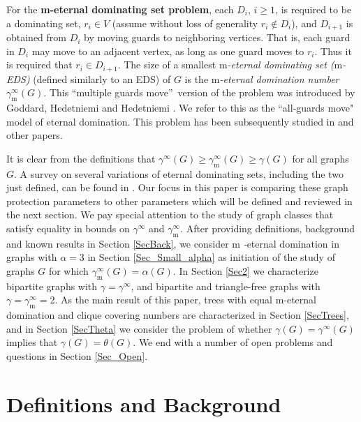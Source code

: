 \documentclass[12pt]{article}%
\begin{document}
For the \textbf{m-eternal dominating set problem}, each $D_{i}$, $i\geq1$, is
required to be a dominating set, $r_{i}\in V$ (assume without loss of
generality $r_{i}\notin D_{i}$), and $D_{i+1}$ is obtained from $D_{i}$ by
moving guards to neighboring vertices. That is, each guard in $D_{i}$ may move
to an adjacent vertex, as long as one guard moves to $r_{i}$. Thus it is
required that $r_{i}\in D_{i+1}$. The size of a smallest $\mathrm{m}%
$\emph{-eternal dominating set (}$\mathrm{m}$\emph{-EDS)} (defined similarly
to an EDS) of $G$ is the $\mathrm{m}$\emph{-eternal domination number}
$\gamma_{\mathrm{m}}^{\infty}(G)$. This \textquotedblleft multiple guards
move\textquotedblright\ version of the problem was introduced by Goddard,
Hedetniemi and Hedetniemi \cite{GHH}. We refer to this as the
\textquotedblleft all-guards move" model of eternal domination. This problem
has been subsequently studied in \cite{GK2, KM2} and other papers.

It is clear from the definitions that $\gamma^{\infty}(G)\geq\gamma
_{\mathrm{m}}^{\infty}(G)\geq\gamma(G)$ for all graphs $G$. A survey on
several variations of eternal dominating sets, including the two just defined,
can be found in \cite{KMSurvey}. Our focus in this paper is comparing these
graph protection parameters to other parameters which will be defined and
reviewed in the next section. We pay special attention to the study of graph
classes that satisfy equality in bounds on $\gamma^{\infty}$ and
$\gamma_{\mathrm{m}}^{\infty}$. After providing definitions, background and
known results in Section \ref{SecBack}, we consider $\mathrm{m}$%
\emph{-}eternal domination in graphs with $\alpha=3$ in Section
\ref{Sec_Small_alpha} as initiation of the study of graphs $G$ for which
$\gamma_{\mathrm{m}}^{\infty}(G)=\alpha(G)$. In Section \ref{Sec2} we
characterize bipartite graphs with $\gamma=\gamma^{\infty}$, and bipartite and
triangle-free graphs with $\gamma=\gamma_{\mathrm{m}}^{\infty}=2$. As the main
result of this paper, trees with equal $\mathrm{m}$-eternal domination and
clique covering numbers are characterized in Section \ref{SecTrees}, and in
Section \ref{SecTheta} we consider the problem of whether $\gamma
(G)=\gamma^{\infty}(G)$ implies that $\gamma(G)=\theta(G)$. We end with a
number of open problems and questions in Section \ref{Sec_Open}.

\section{Definitions and Background}
\end{document}
